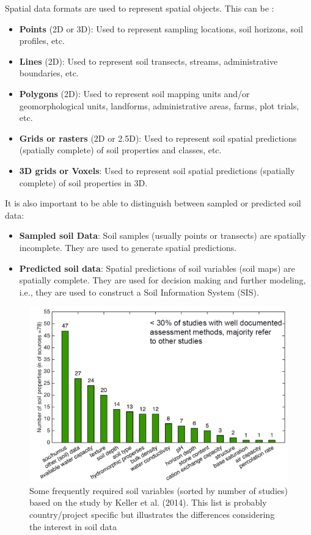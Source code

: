 \documentclass[10pt,b5paper,]{book}
\providecommand{\tightlist}{%
  \setlength{\itemsep}{0pt}\setlength{\parskip}{0pt}}
\theoremstyle{definition}
\theoremstyle{definition}
\theoremstyle{definition}
\theoremstyle{remark}
\begin{document}
Spatial data formats are used to represent spatial objects. This can be
\citep{bivand2013classes, neteler2013open}:

\begin{itemize}
\tightlist
\item
  \textbf{Points} (2D or 3D): Used to represent sampling locations, soil
  horizons, soil profiles, etc.
\item
  \textbf{Lines} (2D): Used to represent soil transects, streams,
  administrative boundaries, etc.
\item
  \textbf{Polygons} (2D): Used to represent soil mapping units and/or
  geomorphological units, landforms, administrative areas, farms, plot
  trials, etc.
\item
  \textbf{Grids or rasters} (2D or 2.5D): Used to represent soil spatial
  predictions (spatially complete) of soil properties and classes, etc.
\item
  \textbf{3D grids or Voxels}: Used to represent soil spatial
  predictions (spatially complete) of soil properties in 3D.
\end{itemize}

It is also important to be able to distinguish between sampled or
predicted soil data:

\begin{itemize}
\tightlist
\item
  \textbf{Sampled soil Data}: Soil samples (usually points or transects)
  are spatially incomplete. They are used to generate spatial
  predictions.
\item
  \textbf{Predicted soil data}: Spatial predictions of soil variables
  (soil maps) are spatially complete. They are used for decision making
  and further modeling, i.e., they are used to construct a Soil
  Information System (SIS).
\end{itemize}

\begin{figure}
\centering
\includegraphics{images/Data_sharing_soil_variables.png}
\caption{Some frequently required soil variables (sorted by number of
studies) based on the study by Keller et al. (2014). This list is
probably country/project specific but illustrates the differences
considering the interest in soil data}
\end{figure}
\end{document}
